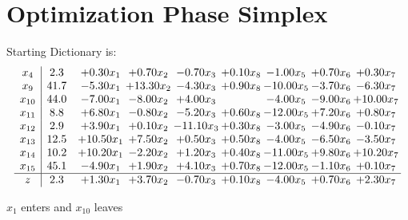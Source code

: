 \documentclass[9pt]{article}
\begin{document}
\section{Optimization Phase Simplex}
Starting Dictionary is:
\[\begin{array}{c| c c@{\hskip 2pt} c@{\hskip 2pt} c@{\hskip 2pt} c@{\hskip 2pt} c@{\hskip 2pt} c@{\hskip 2pt} c@{\hskip 2pt} }
 x_{4}   &  2.3 & +  0.30 x_{1} & +  0.70 x_{2} & -0.70 x_{3} & +  0.10 x_{8} & -1.00 x_{5} & +  0.70 x_{6} & +  0.30 x_{7}\\
 x_{9}   &  41.7 & -5.30 x_{1} & + 13.30 x_{2} & -4.30 x_{3} & +  0.90 x_{8} & -10.00 x_{5} & -3.70 x_{6} & -6.30 x_{7}\\
 x_{10}   &  44.0 & -7.00 x_{1} & -8.00 x_{2} & +  4.00 x_{3} &   & -4.00 x_{5} & -9.00 x_{6} & + 10.00 x_{7}\\
 x_{11}   &  8.8 & +  6.80 x_{1} & -0.80 x_{2} & -5.20 x_{3} & +  0.60 x_{8} & -12.00 x_{5} & +  7.20 x_{6} & +  0.80 x_{7}\\
 x_{12}   &  2.9 & +  3.90 x_{1} & +  0.10 x_{2} & -11.10 x_{3} & +  0.30 x_{8} & -3.00 x_{5} & -4.90 x_{6} & -0.10 x_{7}\\
 x_{13}   &  12.5 & + 10.50 x_{1} & +  7.50 x_{2} & +  0.50 x_{3} & +  0.50 x_{8} & -4.00 x_{5} & -6.50 x_{6} & -3.50 x_{7}\\
 x_{14}   &  10.2 & + 10.20 x_{1} & -2.20 x_{2} & +  1.20 x_{3} & +  0.40 x_{8} & -11.00 x_{5} & +  9.80 x_{6} & + 10.20 x_{7}\\
 x_{15}   &  45.1 & -4.90 x_{1} & +  1.90 x_{2} & +  4.10 x_{3} & +  0.70 x_{8} & -12.00 x_{5} & -1.10 x_{6} & +  0.10 x_{7}\\
\hline
z    &  2.3 & +  1.30 x_{1} & +  3.70 x_{2} & -0.70 x_{3} & +  0.10 x_{8} & -4.00 x_{5} & +  0.70 x_{6} & +  2.30 x_{7}\\
\end{array}\]


 $ x_{1} $ enters and $ x_{10} $ leaves 
\end{document}
